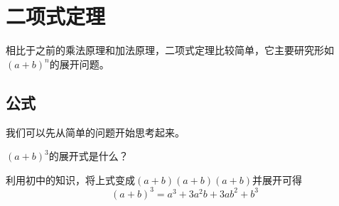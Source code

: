 \chapter{二项式定理}
相比于之前的乘法原理和加法原理，二项式定理比较简单，它主要研究形如$(a+b)^n$的展开问题。

\section{公式}
我们可以先从简单的问题开始思考起来。

\begin{lexample}
	$(a+b)^3$的展开式是什么？
\end{lexample}

利用初中的知识，将上式变成$(a+b)(a+b)(a+b)$并展开可得\[(a+b)^3=a^3+3a^2b+3ab^2+b^3\]
